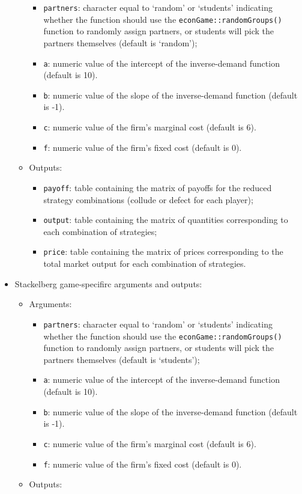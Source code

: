 \documentclass[
]{article}
\providecommand{\tightlist}{%
  \setlength{\itemsep}{0pt}\setlength{\parskip}{0pt}}
\begin{document}
\begin{itemize}
\begin{itemize}
    \begin{itemize}
    \tightlist
    \item
      \texttt{partners}: character equal to `random' or `students'
      indicating whether the function should use the
      \texttt{econGame::randomGroups()} function to randomly assign
      partners, or students will pick the partners themselves (default
      is `random');
    \item
      \texttt{a}: numeric value of the intercept of the inverse-demand
      function (default is 10).
    \item
      \texttt{b}: numeric value of the slope of the inverse-demand
      function (default is -1).
    \item
      \texttt{c}: numeric value of the firm's marginal cost (default is
      6).
    \item
      \texttt{f}: numeric value of the firm's fixed cost (default is 0).
    \end{itemize}
  \item
    Outputs:

    \begin{itemize}
    \tightlist
    \item
      \texttt{payoff}: table containing the matrix of payoffs for the
      reduced strategy combinations (collude or defect for each player);
    \item
      \texttt{output}: table containing the matrix of quantities
      corresponding to each combination of strategies;
    \item
      \texttt{price}: table containing the matrix of prices
      corresponding to the total market output for each combination of
      strategies.
    \end{itemize}
  \end{itemize}
\item
  Stackelberg game-specifirc arguments and outputs:

  \begin{itemize}
  \item
    Arguments:

    \begin{itemize}
    \tightlist
    \item
      \texttt{partners}: character equal to `random' or `students'
      indicating whether the function should use the
      \texttt{econGame::randomGroups()} function to randomly assign
      partners, or students will pick the partners themselves (default
      is `students');
    \item
      \texttt{a}: numeric value of the intercept of the inverse-demand
      function (default is 10).
    \item
      \texttt{b}: numeric value of the slope of the inverse-demand
      function (default is -1).
    \item
      \texttt{c}: numeric value of the firm's marginal cost (default is
      6).
    \item
      \texttt{f}: numeric value of the firm's fixed cost (default is 0).
    \end{itemize}
  \item
    Outputs:


\end{itemize}
\end{itemize}
\end{document}
